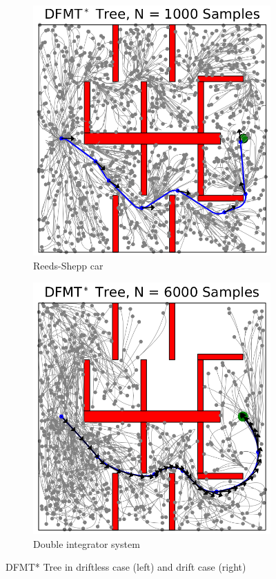 \documentclass[twoside]{article}
\begin{document}
\begin{figure}[h!]
    \centering
    \begin{subfigure}[b]{0.4\linewidth}
      \includegraphics[width=\linewidth]{driftless.png}
      \caption{Reeds-Shepp car}
    \end{subfigure}
    \begin{subfigure}[b]{0.4\linewidth}
      \includegraphics[width=\linewidth]{drift.png}
      \caption{Double integrator system}
    \end{subfigure}
    \caption{DFMT* Tree in driftless case (left) and drift case (right)}
    \label{fig:kino}
  \end{figure}
\end{document}
